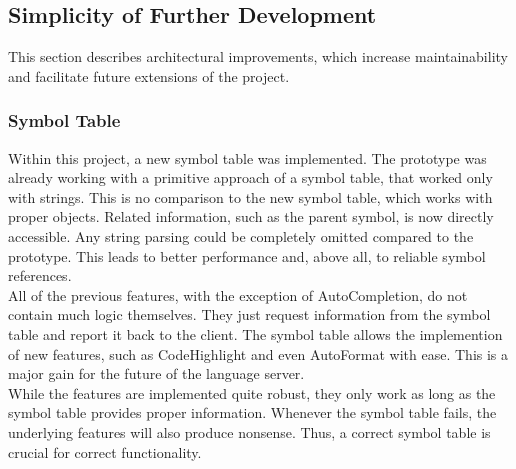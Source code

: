 \subsection{Simplicity of Further Development}
This section describes architectural improvements,
which increase maintainability and facilitate future extensions of the project.

\subsubsection{Symbol Table}
Within this project, a new symbol table was implemented.
The prototype was already working with a primitive approach of a symbol table, that worked only with strings.
This is no comparison to the new symbol table, which works with proper objects.
Related information, such as the parent symbol, is now directly accessible.
Any string parsing could be completely omitted compared to the prototype.
This leads to better performance and, above all, to reliable symbol references.\\

All of the previous features, with the exception of AutoCompletion, do not contain much logic themselves.
They just request information from the symbol table and report it back to the client.
The symbol table allows the implemention of new features, such as CodeHighlight and even AutoFormat with ease.
This is a major gain for the future of the language server.\\


While the features are implemented quite robust, they only work as long as the symbol table provides proper information.
Whenever the symbol table fails, the underlying features will also produce nonsense.
Thus, a correct symbol table is crucial for correct functionality.\\

